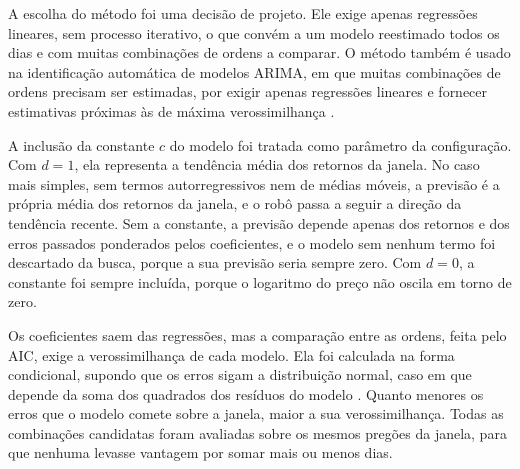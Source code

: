 A escolha do método foi uma decisão de projeto. Ele exige apenas regressões
lineares, sem processo iterativo, o que convém a um modelo reestimado todos os
dias e com muitas combinações de ordens a comparar. O método também é usado na
identificação automática de modelos ARIMA, em que muitas combinações de ordens
precisam ser estimadas, por exigir apenas regressões lineares e fornecer
estimativas próximas às de máxima verossimilhança \cite{gomez1998}.

A inclusão da constante $c$ do modelo foi tratada como parâmetro da configuração.
Com $d = 1$, ela representa a tendência média dos retornos da janela. No caso mais
simples, sem termos autorregressivos nem de médias móveis, a previsão é a própria
média dos retornos da janela, e o robô passa a seguir a direção da tendência
recente. Sem a constante, a previsão depende apenas dos retornos e dos erros
passados ponderados pelos coeficientes, e o modelo sem nenhum termo foi descartado
da busca, porque a sua previsão seria sempre zero. Com $d = 0$, a constante foi
sempre incluída, porque o logaritmo do preço não oscila em torno de zero.

Os coeficientes saem das regressões, mas a comparação entre as ordens, feita pelo
AIC, exige a verossimilhança de cada modelo. Ela foi calculada na forma
condicional, supondo que os erros sigam a distribuição normal, caso em que depende
da soma dos quadrados dos resíduos do modelo \cite[p.~42]{thomaz2019}. Quanto
menores os erros que o modelo comete sobre a janela, maior a sua verossimilhança.
Todas as combinações candidatas foram avaliadas sobre os mesmos pregões da janela,
para que nenhuma levasse vantagem por somar mais ou menos dias.

